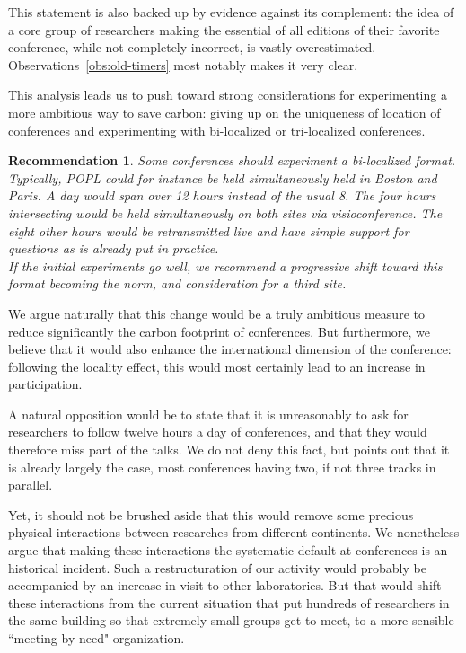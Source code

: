 \documentclass[manuscript, review, screen]{acmart}
\newtheorem{recommend}{Recommendation}
\begin{document}
This statement is also backed up by evidence against its complement: the idea of a core
group of researchers making the essential of all editions of their favorite conference,
while not completely incorrect, is vastly overestimated. Observations~\ref{obs:old-timers}
most notably makes it very clear.

This analysis leads us to push toward strong considerations for experimenting a more
ambitious way to save carbon: giving up on the uniqueness of location of conferences and
experimenting with bi-localized or tri-localized conferences.

\begin{recommend}
  Some conferences should experiment a bi-localized format. Typically, POPL could for
  instance be held simultaneously held in Boston and Paris. A day would span over 12 hours
  instead of the usual 8. The four hours intersecting would be held simultaneously on
  both sites via visioconference. The eight other hours would be retransmitted live and
  have simple support for questions as is already put in practice.\\
  If the initial experiments go well, we recommend a progressive shift toward this
  format becoming the norm, and consideration for a third site.
\end{recommend}

We argue naturally that this change would be a truly ambitious measure to reduce
significantly the carbon footprint of conferences. But furthermore, we believe that
it would also enhance the international dimension of the conference: following
the locality effect, this would most certainly lead to an increase in participation.

A natural opposition would be to state that it is unreasonably to ask for researchers to
follow twelve hours a day of conferences, and that they would therefore miss part of the
talks. We do not deny this fact, but points out that it is already largely the case,
most conferences having two, if not three tracks in parallel.

Yet, it should not be brushed aside that this would remove some precious
physical interactions between researches from different continents. We
nonetheless argue that making these interactions the systematic default at conferences
is an historical incident. Such a restructuration of our activity would probably
be accompanied by an increase in visit to other laboratories. But that would shift
these interactions from the current situation that put hundreds of researchers in the
same building so that extremely small groups get to meet, to a more sensible ``meeting
by need" organization.
\end{document}
